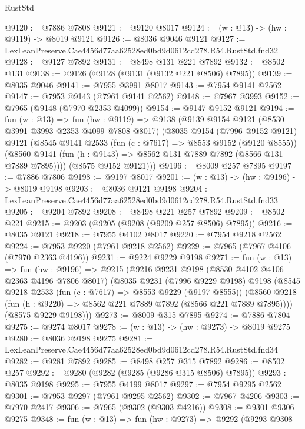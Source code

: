 \begin{lexlean}{RustStd}
\begin{coremodule}
@9120 := @7886 @7808
@9121 := @9120 @8017
@9124 := (w : @13) -> (hw : @9119) -> @8019 @9121
@9126 := @8036 @9046 @9121
@9127 := LexLeanPreserve.Cae4456d77aa62528ed0bd9d0612cd278.R54.RustStd.fnd32
@9128 := @9127 @7892
@9131 := @8498 @131 @221 @7892
@9132 := @8502 @131
@9138 := @9126 (@9128 (@9131 (@9132 @221 @8506) @7895))
@9139 := @8035 @9046
@9141 := @7955 @3991 @8017
@9143 := @7954 @9141 @2562
@9147 := @7953 @9143 (@7961 @9141 @2562)
@9148 := @7967 @3993
@9152 := @7965 (@9148 (@7970 @2353 @4099))
@9154 := @9147 @9152 @9121
@9194 := fun (w : @13) =>
  fun (hw : @9119) =>
  @9138
    (@9139
      @9154
      @9121
      (@8530 @3991 @3993 @2353 @4099 @7808 @8017)
      (@8035
        @9154
        (@7996 @9152 @9121)
        @9121
        (@8545
          @9141
          @2533
          (fun (c : @7617) => @8553 @9152 (@9120 @8555))
          (@8560 @9141 (fun (h : @9143) => @8562 @131 @7889 @7892 (@8566 @131 @7889 @7895))))
        (@8575 @9152 @9121)))
@9196 := @8009 @257 @7895
@9197 := @7886 @7806
@9198 := @9197 @8017
@9201 := (w : @13) -> (hw : @9196) -> @8019 @9198
@9203 := @8036 @9121 @9198
@9204 := LexLeanPreserve.Cae4456d77aa62528ed0bd9d0612cd278.R54.RustStd.fnd33
@9205 := @9204 @7892
@9208 := @8498 @221 @257 @7892
@9209 := @8502 @221
@9215 := @9203 (@9205 (@9208 (@9209 @257 @8506) @7895))
@9216 := @8035 @9121
@9218 := @7955 @4102 @8017
@9220 := @7954 @9218 @2562
@9224 := @7953 @9220 (@7961 @9218 @2562)
@9229 := @7965 (@7967 @4106 (@7970 @2363 @4196))
@9231 := @9224 @9229 @9198
@9271 := fun (w : @13) =>
  fun (hw : @9196) =>
  @9215
    (@9216
      @9231
      @9198
      (@8530 @4102 @4106 @2363 @4196 @7806 @8017)
      (@8035
        @9231
        (@7996 @9229 @9198)
        @9198
        (@8545
          @9218
          @2533
          (fun (c : @7617) => @8553 @9229 (@9197 @8555))
          (@8560 @9218 (fun (h : @9220) => @8562 @221 @7889 @7892 (@8566 @221 @7889 @7895))))
        (@8575 @9229 @9198)))
@9273 := @8009 @315 @7895
@9274 := @7886 @7804
@9275 := @9274 @8017
@9278 := (w : @13) -> (hw : @9273) -> @8019 @9275
@9280 := @8036 @9198 @9275
@9281 := LexLeanPreserve.Cae4456d77aa62528ed0bd9d0612cd278.R54.RustStd.fnd34
@9282 := @9281 @7892
@9285 := @8498 @257 @315 @7892
@9286 := @8502 @257
@9292 := @9280 (@9282 (@9285 (@9286 @315 @8506) @7895))
@9293 := @8035 @9198
@9295 := @7955 @4199 @8017
@9297 := @7954 @9295 @2562
@9301 := @7953 @9297 (@7961 @9295 @2562)
@9302 := @7967 @4206
@9303 := @7970 @2417
@9306 := @7965 (@9302 (@9303 @4216))
@9308 := @9301 @9306 @9275
@9348 := fun (w : @13) =>
  fun (hw : @9273) =>
  @9292
    (@9293
      @9308

\end{coremodule}
\end{lexlean}
